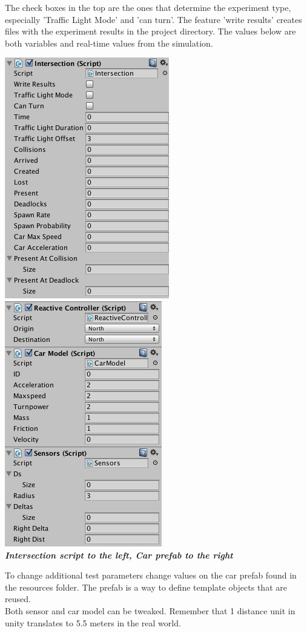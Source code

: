 \noindent
The check boxes in the top are the ones that determine the experiment type, especially 'Traffic Light Mode' and 'can turn'. The feature 'write results' creates files with the experiment results in the project directory.
The values below are both variables and real-time values from the simulation.\\

\begin{center}
\includegraphics[scale=.5]{img/intersection-panel}
\includegraphics[scale=.5]{img/car-prefab}\\
\textit{\textbf{Intersection script to the left, Car prefab to the right}}
\end{center}

\noindent
To change additional test parameters change values on the car prefab found in the resources folder. The prefab is a way to define template objects that are reused.\\

\noindent
Both sensor and car model can be tweaked. Remember that 1 distance unit in unity translates to 5.5 meters in the real world.
